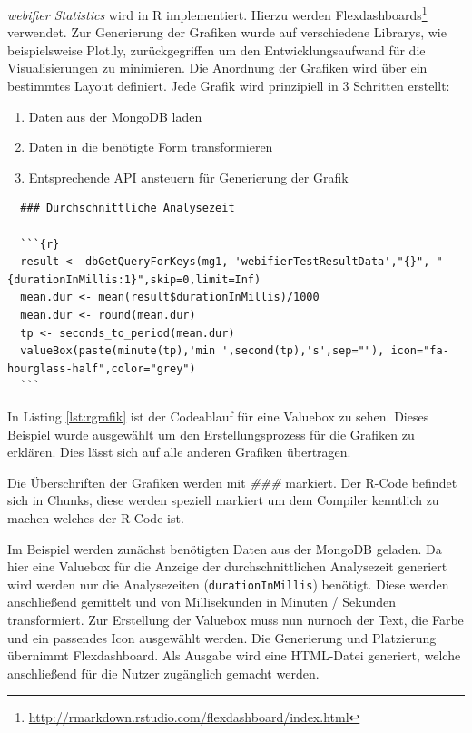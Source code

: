 \textit{webifier Statistics} wird in R implementiert. Hierzu werden
Flexdashboards\footnote{\url{http://rmarkdown.rstudio.com/flexdashboard/index.html}} verwendet. Zur
Generierung der Grafiken wurde auf verschiedene Librarys, wie beispielsweise Plot.ly,
zurückgegriffen um den Entwicklungsaufwand für die Visualisierungen zu minimieren. Die Anordnung der Grafiken wird über ein bestimmtes Layout definiert. Jede Grafik wird prinzipiell in 3 Schritten erstellt:

\begin{enumerate}
  \item Daten aus der MongoDB laden
  \item Daten in die benötigte Form transformieren
  \item Entsprechende API ansteuern für Generierung der Grafik
\end{enumerate}

\begin{scriptsize}
\begin{lstlisting}
  ### Durchschnittliche Analysezeit

  ```{r}
  result <- dbGetQueryForKeys(mg1, 'webifierTestResultData',"{}", "{durationInMillis:1}",skip=0,limit=Inf)
  mean.dur <- mean(result$durationInMillis)/1000
  mean.dur <- round(mean.dur)
  tp <- seconds_to_period(mean.dur)
  valueBox(paste(minute(tp),'min ',second(tp),'s',sep=""), icon="fa-hourglass-half",color="grey")
  ```
\end{lstlisting}
\end{scriptsize}

In Listing \ref{lst:rgrafik} ist der Codeablauf für eine Valuebox zu sehen. Dieses Beispiel
wurde ausgewählt um den Erstellungsprozess für die Grafiken zu erklären. Dies lässt sich auf alle anderen Grafiken übertragen.

Die Überschriften der Grafiken werden mit \textit{\#\#\#} markiert. Der R-Code befindet sich in Chunks, diese werden speziell markiert um dem Compiler kenntlich zu machen welches der R-Code ist.

Im Beispiel werden zunächst benötigten Daten aus der MongoDB geladen. Da hier eine Valuebox für die
Anzeige der durchschnittlichen Analysezeit generiert wird werden nur die
Analysezeiten (\lstinline[style=eclipse]{durationInMillis}) benötigt. Diese werden anschließend
gemittelt und von Millisekunden in Minuten / Sekunden transformiert. Zur Erstellung der Valuebox
muss nun nurnoch der Text, die Farbe und ein passendes Icon ausgewählt werden. Die Generierung und
Platzierung übernimmt Flexdashboard. Als Ausgabe wird eine \ac{HTML}-Datei generiert, welche
anschließend für die Nutzer zugänglich gemacht werden.

